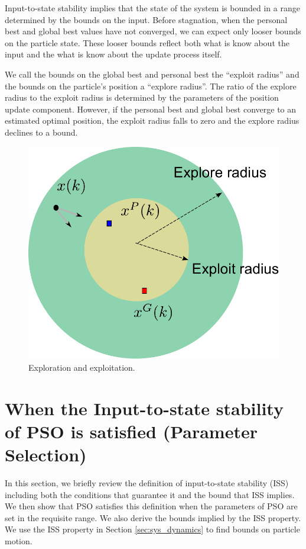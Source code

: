\documentclass{sig-alternate}
\begin{document}
Input-to-state stability implies that the state of the system is bounded in a range determined by the bounds on the input.
Before stagnation, when the personal best and global best values have not converged, we can expect only looser bounds on the particle state.
These looser bounds reflect both what is know about the input and the what is know about the update process itself.

We call the bounds on the global best and personal best the ``exploit radius'' and the bounds on the particle's position a ``explore radius''.
The ratio of the explore radius to the exploit radius is determined by the parameters of the position update component.
However, if the personal best and global best converge to an estimated optimal position, the exploit radius falls to zero and the explore radius declines to a bound.

\begin{figure}
\centering
\includegraphics[width=0.6\linewidth]{./explore_and_exploit}
\caption{Exploration and exploitation.}
\label{fig:explore_and_exploit}
\end{figure}

\section{When the Input-to-state stability of PSO is satisfied (Parameter Selection)}
\label{sec:iss}

In this section, we briefly review the definition of input-to-state stability (ISS) including both the conditions that guarantee it and the bound that ISS implies\cite{Jiang2001857}. 
We then show that PSO satisfies this definition when the parameters of PSO are set in the requisite range. 
We also derive the bounds implied by the ISS property.
We use the ISS property in Section \ref{sec:sys_dynamics} to find bounds on particle motion.
\end{document}
